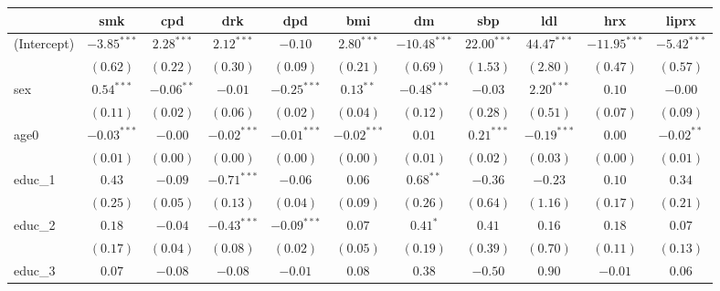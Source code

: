 
\begin{tabular}{l c c c c c c c c c c}
\toprule
 & smk & cpd & drk & dpd & bmi & dm & sbp & ldl & hrx & liprx \\
\midrule
(Intercept)      & $-3.85^{***}$ & $2.28^{***}$  & $2.12^{***}$  & $-0.10$       & $2.80^{***}$  & $-10.48^{***}$ & $22.00^{***}$ & $44.47^{***}$  & $-11.95^{***}$ & $-5.42^{***}$ \\
                 & $(0.62)$      & $(0.22)$      & $(0.30)$      & $(0.09)$      & $(0.21)$      & $(0.69)$       & $(1.53)$      & $(2.80)$       & $(0.47)$       & $(0.57)$      \\
sex              & $0.54^{***}$  & $-0.06^{**}$  & $-0.01$       & $-0.25^{***}$ & $0.13^{**}$   & $-0.48^{***}$  & $-0.03$       & $2.20^{***}$   & $0.10$         & $-0.00$       \\
                 & $(0.11)$      & $(0.02)$      & $(0.06)$      & $(0.02)$      & $(0.04)$      & $(0.12)$       & $(0.28)$      & $(0.51)$       & $(0.07)$       & $(0.09)$      \\
age0             & $-0.03^{***}$ & $-0.00$       & $-0.02^{***}$ & $-0.01^{***}$ & $-0.02^{***}$ & $0.01$         & $0.21^{***}$  & $-0.19^{***}$  & $0.00$         & $-0.02^{**}$  \\
                 & $(0.01)$      & $(0.00)$      & $(0.00)$      & $(0.00)$      & $(0.00)$      & $(0.01)$       & $(0.02)$      & $(0.03)$       & $(0.00)$       & $(0.01)$      \\
educ\_1          & $0.43$        & $-0.09$       & $-0.71^{***}$ & $-0.06$       & $0.06$        & $0.68^{**}$    & $-0.36$       & $-0.23$        & $0.10$         & $0.34$        \\
                 & $(0.25)$      & $(0.05)$      & $(0.13)$      & $(0.04)$      & $(0.09)$      & $(0.26)$       & $(0.64)$      & $(1.16)$       & $(0.17)$       & $(0.21)$      \\
educ\_2          & $0.18$        & $-0.04$       & $-0.43^{***}$ & $-0.09^{***}$ & $0.07$        & $0.41^{*}$     & $0.41$        & $0.16$         & $0.18$         & $0.07$        \\
                 & $(0.17)$      & $(0.04)$      & $(0.08)$      & $(0.02)$      & $(0.05)$      & $(0.19)$       & $(0.39)$      & $(0.70)$       & $(0.11)$       & $(0.13)$      \\
educ\_3          & $0.07$        & $-0.08$       & $-0.08$       & $-0.01$       & $0.08$        & $0.38$         & $-0.50$       & $0.90$         & $-0.01$        & $0.06$        \\

\end{tabular}
